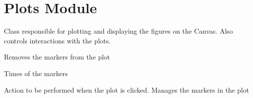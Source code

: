 \documentclass[letterpaper,10pt,english]{sphinxmanual}
\begin{document}
\chapter{Plots Module}
\label{\detokenize{plots:module-plots}}\label{\detokenize{plots:plots-module}}\label{\detokenize{plots::doc}}

\begin{fulllineitems}
\label{\detokenize{plots:plots.Plots}}
\sphinxAtStartPar
Class responsible for plotting and displaying the figures on the Canvas.
Also controls interactions with the plots.

\begin{fulllineitems}
\label{\detokenize{plots:plots.Plots.clear}}
\sphinxAtStartPar
Removes the markers from the plot

\end{fulllineitems}


\begin{fulllineitems}
\label{\detokenize{plots:plots.Plots.get_times}}
\sphinxAtStartPar
Times of the markers

\end{fulllineitems}


\begin{fulllineitems}
\label{\detokenize{plots:plots.Plots.on_click}}
\sphinxAtStartPar
Action to be performed when the plot is clicked. Manages the markers in the plot

\end{fulllineitems}


\end{fulllineitems}
\end{document}
